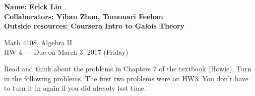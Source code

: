 \documentclass[12pt]{article}
\begin{document}
\noindent
\textbf{Name: Erick Lin} \smallskip  \\
\textbf{Collaborators: Yihan Zhou, Tomonari Feehan} \smallskip \\ %
\textbf{Outside resources: Coursera Intro to Galois Theory} \smallskip \\ %

\begin{center}
{
Math 4108, Algebra II \\
HW 4 --- Due on March 3, 2017 (Friday)
}
\end{center}

\noindent Read and think about the problems in Chapters 7 of the textbook (Howie).  Turn in the following problems.  The first two problems were on HW3.  You don't have to turn it in again if you did already last time.
\end{document}

